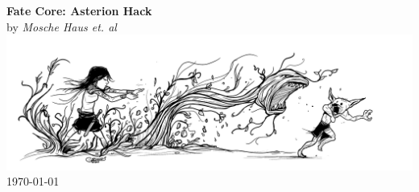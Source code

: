 \thispagestyle{empty} %

\newcommand{\booktitle}{Fate Core: Asterion Hack}
\newcommand{\authorname}{Mosche Haus \emph{et. al}}

\begin{titlepage}
    \centering
    {\Huge\textbf{\booktitle}}\\[1.5cm]
    {\Large by \textit{\authorname}}\\[2cm]
    \includegraphics[width=\textwidth]{logo}\\[2cm]
    \vfill
    {\large \today}
\end{titlepage}

\newpage
